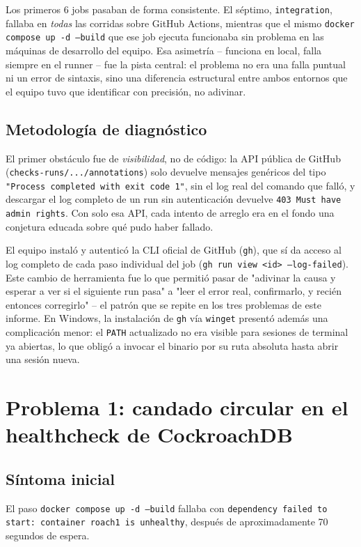 \documentclass[11pt,letterpaper]{article}
\begin{document}
Los primeros 6 jobs pasaban de forma consistente. El séptimo, \texttt{integration}, fallaba en
\emph{todas} las corridas sobre GitHub Actions, mientras que el mismo
\texttt{docker compose up -d --build} que ese job ejecuta funcionaba sin problema en las máquinas
de desarrollo del equipo. Esa asimetría -- funciona en local, falla siempre en el runner -- fue
la pista central: el problema no era una falla puntual ni un error de sintaxis, sino una
diferencia estructural entre ambos entornos que el equipo tuvo que identificar con precisión, no
adivinar.

\subsection{Metodología de diagnóstico}

El primer obstáculo fue de \emph{visibilidad}, no de código: la API pública de GitHub
(\texttt{checks-runs/.../annotations}) solo devuelve mensajes genéricos del tipo
\texttt{"Process completed with exit code 1"}, sin el log real del comando que falló, y
descargar el log completo de un run sin autenticación devuelve \texttt{403 Must have admin
rights}. Con solo esa API, cada intento de arreglo era en el fondo una conjetura educada sobre
qué pudo haber fallado.

El equipo instaló y autenticó la CLI oficial de GitHub (\texttt{gh}), que sí da acceso al log
completo de cada paso individual del job (\texttt{gh run view <id> --log-failed}). Este cambio
de herramienta fue lo que permitió pasar de "adivinar la causa y esperar a ver si el siguiente
run pasa" a "leer el error real, confirmarlo, y recién entonces corregirlo" -- el patrón que
se repite en los tres problemas de este informe. En Windows, la instalación de \texttt{gh} vía
\texttt{winget} presentó además una complicación menor: el \texttt{PATH} actualizado no era
visible para sesiones de terminal ya abiertas, lo que obligó a invocar el binario por su ruta
absoluta hasta abrir una sesión nueva.

\section{Problema 1: candado circular en el healthcheck de CockroachDB}

\subsection{Síntoma inicial}
El paso \texttt{docker compose up -d --build} fallaba con
\texttt{dependency failed to start: container roach1 is unhealthy}, después de aproximadamente
70 segundos de espera.
\end{document}
